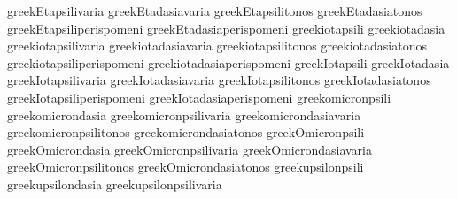  greekEtapsilivaria                  {}
 greekEtadasiavaria                  {}
 greekEtapsilitonos                  {}
 greekEtadasiatonos                  {}
 greekEtapsiliperispomeni            {}
 greekEtadasiaperispomeni            {}
 greekiotapsili                      {} %
 greekiotadasia                      {}
 greekiotapsilivaria                 {}
 greekiotadasiavaria                 {}
 greekiotapsilitonos                 {}
 greekiotadasiatonos                 {}
 greekiotapsiliperispomeni           {}
 greekiotadasiaperispomeni           {}
 greekIotapsili                      {}
 greekIotadasia                      {}
 greekIotapsilivaria                 {}
 greekIotadasiavaria                 {}
 greekIotapsilitonos                 {}
 greekIotadasiatonos                 {}
 greekIotapsiliperispomeni           {}
 greekIotadasiaperispomeni           {}
 greekomicronpsili                   {} %
 greekomicrondasia                   {}
 greekomicronpsilivaria              {}
 greekomicrondasiavaria              {}
 greekomicronpsilitonos              {}
 greekomicrondasiatonos              {}
 greekOmicronpsili                   {}
 greekOmicrondasia                   {}
 greekOmicronpsilivaria              {}
 greekOmicrondasiavaria              {}
 greekOmicronpsilitonos              {}
 greekOmicrondasiatonos              {}
 greekupsilonpsili                   {} %
 greekupsilondasia                   {}
 greekupsilonpsilivaria              {}
